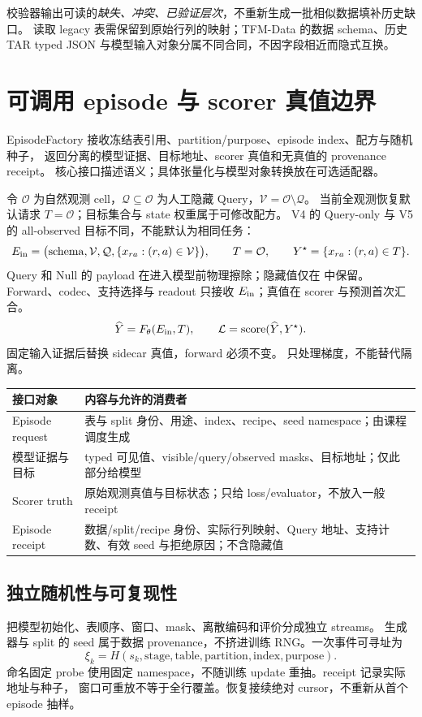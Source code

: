 \documentclass[10pt,UTF8,fontset=fandol]{ctexart}
\newcommand{\code}[1]{\texttt{\detokenize{#1}}}
\newcommand{\V}{\mathcal V}
\newcommand{\Q}{\mathcal Q}
\newcommand{\Obs}{\mathcal O}
\begin{document}
校验器输出可读的\emph{缺失、冲突、已验证层次}，不重新生成一批相似数据填补历史缺口。
读取 legacy 表需保留到原始行列的映射；TFM-Data 的数据 schema、历史 TAR typed JSON
与模型输入对象分属不同合同，不因字段相近而隐式互换。

\newpage
\section{可调用 episode 与 scorer 真值边界}
EpisodeFactory 接收冻结表引用、partition/purpose、episode index、配方与随机种子，
返回分离的模型证据、目标地址、scorer 真值和无真值的 provenance receipt。
核心接口描述语义；具体张量化与模型对象转换放在可选适配器。

令 $\Obs$ 为自然观测 cell，$\Q\subseteq\Obs$ 为人工隐藏 Query，$\V=\Obs\setminus\Q$。
当前全观测恢复默认请求 $T=\Obs$；目标集合与 state 权重属于可修改配方。
V4 的 Query-only 与 V5 的 all-observed 目标不同，不能默认为相同任务：
\[
E_{\rm in}=\bigl(\mathrm{schema},\V,\Q,\{x_{ra}:(r,a)\in\V\}\bigr),
\qquad T=\Obs,\qquad Y^\star=\{x_{ra}:(r,a)\in T\}.
\]
Query 和 Null 的 payload 在进入模型前物理擦除；隐藏值仅在 \code{TruthSidecar} 中保留。
Forward、codec、支持选择与 readout 只接收 $E_{\rm in}$；真值在 scorer 与预测首次汇合。
\[
\widehat Y=F_\theta(E_{\rm in},T),\qquad
\mathcal L=\mathrm{score}(\widehat Y,Y^\star).
\]
固定输入证据后替换 sidecar 真值，forward 必须不变。\code{detach()} 只处理梯度，不能替代隔离。

\begin{center}\small
\begin{tabularx}{\linewidth}{@{}p{34mm}Y@{}}\toprule
接口对象 & 内容与允许的消费者 \\\midrule
Episode request & 表与 split 身份、用途、index、recipe、seed namespace；由课程调度生成 \\
模型证据与目标 & typed 可见值、visible/query/observed masks、目标地址；仅此部分给模型 \\
Scorer truth & 原始观测真值与目标状态；只给 loss/evaluator，不放入一般 receipt \\
Episode receipt & 数据/split/recipe 身份、实际行列映射、Query 地址、支持计数、有效 seed 与拒绝原因；不含隐藏值 \\\bottomrule
\end{tabularx}
\end{center}

\subsection{独立随机性与可复现性}
把模型初始化、表顺序、窗口、mask、离散编码和评价分成独立 streams。
生成器与 split 的 seed 属于数据 provenance，不挤进训练 RNG。一次事件可寻址为
\[
\xi_k=H(s_k,\mathrm{stage},\mathrm{table},\mathrm{partition},\mathrm{index},\mathrm{purpose}).
\]
命名固定 probe 使用固定 namespace，不随训练 update 重抽。receipt 记录实际地址与种子，
窗口可重放不等于全行覆盖。恢复接续绝对 cursor，不重新从首个 episode 抽样。
\end{document}
